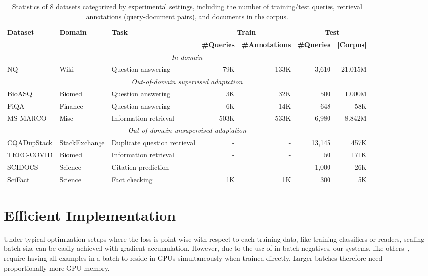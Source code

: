 \documentclass[11pt, dvipsnames]{article}
\newcommand{\msm}{MS MARCO\xspace}
\begin{document}
\begin{table*}[tb]
\centering
\small
\begin{tabular}{l|l|l|rr|rr}
\toprule
\multirow{2}{*}{\textbf{Dataset}} & \multirow{2}{*}{\textbf{Domain}} & \multirow{2}{*}{\textbf{Task}} & \multicolumn{2}{c|}{\textbf{Train}} & \multicolumn{2}{c}{\textbf{Test}} \\
 & & & \textbf{\#Queries} & \textbf{\#Annotations} & \textbf{\#Queries} & \textbf{|Corpus|} \\
\hline
\multicolumn{7}{c}{\emph{In-domain}} \\
NQ & Wiki & Question answering & 79K & 133K & 3,610 & 21.015M \\
\midrule
\multicolumn{7}{c}{\emph{Out-of-domain supervised adaptation}} \\
BioASQ & Biomed & Question answering & 3K & 32K & 500 & 1.000M \\
FiQA & Finance & Question answering & 6K & 14K & 648 & 58K \\
\msm & Misc & Information retrieval & 503K & 533K & 6,980 & 8.842M \\
\midrule
\multicolumn{7}{c}{\emph{Out-of-domain unsupervised adaptation}} \\
CQADupStack & StackExchange & Duplicate question retrieval & - & - & 13,145 & 457K \\
TREC-COVID & Biomed & Information retrieval & - & - & 50 & 171K \\
SCIDOCS & Science & Citation prediction & - & - & 1,000 & 26K \\
SciFact & Science & Fact checking & 1K & 1K & 300 & 5K \\
\bottomrule
\end{tabular}
\caption{Statistics of 8 datasets categorized by experimental settings, including the number of training/test queries, retrieval annotations (query-document pairs), and documents in the corpus.}
\label{tab:datasets}
\end{table*}

\newpage

\section{Efficient Implementation}\label{app:eff_impl}
Under typical optimization setups where the loss is point-wise with respect to each training data, like training classifiers or readers, scaling batch size can be easily achieved with gradient accumulation. However, due to the use of in-batch negatives, our systems, like others~\cite{dpr-2020-karpukhin, rocketqa-2021-qu}, require having all examples in a batch to reside in GPUs simultaneously when trained directly. Larger batches therefore need proportionally more GPU memory.
\end{document}
